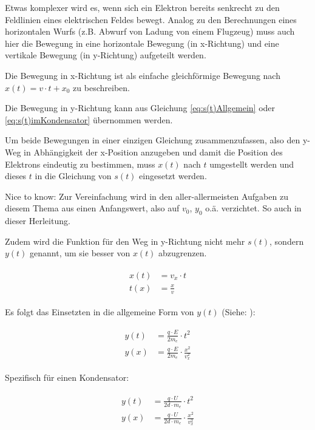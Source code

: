 Etwas komplexer wird es, wenn sich ein Elektron bereits senkrecht zu den Feldlinien eines elektrischen Feldes bewegt. Analog zu den Berechnungen eines horizontalen Wurfs (z.B. Abwurf von Ladung von einem Flugzeug) muss auch hier die Bewegung in eine horizontale Bewegung (\glqq in x-Richtung\grqq) und eine vertikale Bewegung (\glqq in y-Richtung\grqq) aufgeteilt werden. 

Die Bewegung in x-Richtung ist als einfache gleichförmige Bewegung nach $x(t)=v \cdot t + x_0$ zu beschreiben. 

Die Bewegung in y-Richtung kann aus Gleichung \ref{eq:s(t)Allgemein} oder \ref{eq:s(t)imKondensator} übernommen werden.

Um beide Bewegungen in einer einzigen Gleichung zusammenzufassen, also den y-Weg in Abhängigkeit der x-Position anzugeben und damit die Position des Elektrons eindeutig zu bestimmen, 
muss $x(t)$ nach $t$ umgestellt werden und dieses $t$ in die Gleichung von $s(t)$ eingesetzt werden. 

\begin{leftbar}
Nice to know: Zur Vereinfachung wird in den aller-allermeisten Aufgaben zu diesem Thema aus einen Anfangswert, also auf $v_0$, $y_0$ o.ä. verzichtet. So auch in dieser Herleitung.
\end{leftbar}

Zudem wird die Funktion für den Weg in y-Richtung nicht mehr $s(t)$, sondern $y(t)$ genannt, um sie besser von $x(t)$ abzugrenzen.

\begin{align} \label{eq:x(t)Senkrecht}
\begin{split}
	x(t) &= v_x \cdot t \\
	t(x) &= \frac{x}{v}
\end{split}
\end{align}

\noindent Es folgt das Einsetzten in die allgemeine Form von $y(t)$ (Siehe: ):

\begin{align} \label{eq:y(x)Allgemein}
\begin{split}
	y(t) &= \frac{q \cdot E}{2m_e} \cdot t^2 \\
	y(x) &= \frac{q \cdot E}{2m_e} \cdot \frac{x^2}{v_{x}^2}
\end{split}
\end{align}

\noindent Spezifisch für einen Kondensator:

\begin{align} \label{eq:y(x)imKondensator}
\begin{split}
	y(t) &= \frac{q \cdot U}{2d \cdot m_e} \cdot t^2 \\
	y(x) &= \frac{q \cdot U}{2d \cdot m_e} \cdot \frac{x^2}{v_{x}^2}
\end{split}
\end{align}





